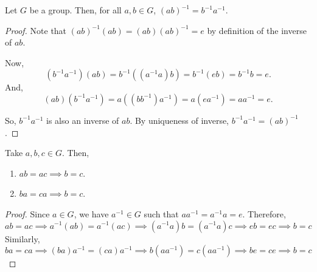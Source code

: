 \documentclass[11pt]{penrose}
\begin{document}
\begin{nthm}
    Let $G$ be a group. Then, for all $a, b \in G$, $(ab)^{-1} = b^{-1} a^{-1}$.
\end{nthm}
\begin{proof}
    Note that $(ab)^{-1} (ab) = (ab) (ab)^{-1} = e$ by definition of the inverse of $ab$.

    Now,
    \begin{equation*}
        (b^{-1} a^{-1}) (a b)
        = b^{-1} ((a^{-1} a) b)
        = b^{-1} (e b)
        = b^{-1} b
        = e.
    \end{equation*}
    And,
    \begin{equation*}
        (a b) (b^{-1} a^{-1})
        = a ((b b^{-1}) a^{-1})
        = a (e a^{-1})
        = a a^{-1}
        = e.
    \end{equation*}

    So, $b^{-1} a^{-1}$ is also an inverse of $ab$. By uniqueness of inverse, $b^{-1} a^{-1} = (ab)^{-1}$.
\end{proof}

\begin{nthm}
    Take $a, b, c \in G$. Then,
    \begin{enumerate}
        \item $ab = ac \implies b = c$.
        \item $ba = ca \implies b = c$.
    \end{enumerate}
\end{nthm}
\begin{proof}
    Since $a \in G$, we have $a^{-1} \in G$ such that $a a^{-1} = a^{-1} a = e$. Therefore,
    \begin{equation*}
        ab = ac
        \implies a^{-1} (ab) = a^{-1} (ac)
        \implies (a^{-1} a)b = (a^{-1} a)c
        \implies eb = ec
        \implies b = c
    \end{equation*}
    Similarly,
    \begin{equation*}
        ba = ca
        \implies (ba)a^{-1} = (ca)a^{-1}
        \implies b (a a^{-1}) = c (a a^{-1})
        \implies be = ce
        \implies b = c
    \end{equation*}
\end{proof}
\end{document}
